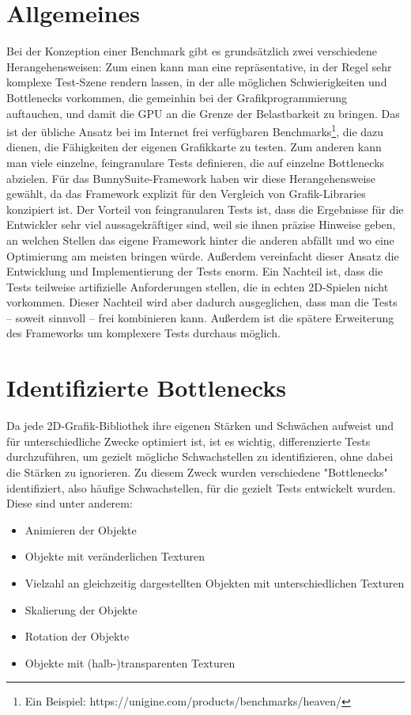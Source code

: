 \section{Allgemeines}
Bei der Konzeption einer Benchmark gibt es grundsätzlich zwei verschiedene Herangehensweisen: Zum einen kann man eine repräsentative, in der Regel sehr komplexe Test-Szene rendern lassen, in der alle möglichen Schwierigkeiten und Bottlenecks vorkommen, die gemeinhin bei der Grafikprogrammierung auftauchen, und damit die GPU an die Grenze der Belastbarkeit zu bringen. Das ist der übliche Ansatz bei im Internet frei verfügbaren Benchmarks\footnote{Ein Beispiel: https://unigine.com/products/benchmarks/heaven/}, die dazu dienen, die Fähigkeiten der eigenen Grafikkarte zu testen. Zum anderen kann man viele einzelne, feingranulare Tests definieren, die auf einzelne Bottlenecks abzielen. Für das BunnySuite-Framework haben wir diese Herangehensweise gewählt, da das Framework explizit für den Vergleich von Grafik-Libraries konzipiert ist. Der Vorteil von feingranularen Tests ist, dass die Ergebnisse für die Entwickler sehr viel aussagekräftiger sind, weil sie ihnen präzise Hinweise geben, an welchen Stellen das eigene Framework hinter die anderen abfällt und wo eine Optimierung am meisten bringen würde. Außerdem vereinfacht dieser Ansatz die Entwicklung und Implementierung der Tests enorm. Ein Nachteil ist, dass die Tests teilweise artifizielle Anforderungen stellen, die in echten 2D-Spielen nicht vorkommen. Dieser Nachteil wird aber dadurch ausgeglichen, dass man die Tests -- soweit sinnvoll -- frei kombinieren kann. Außerdem ist die spätere Erweiterung des Frameworks um komplexere Tests durchaus möglich.

\section{Identifizierte Bottlenecks}
Da jede 2D-Grafik-Bibliothek ihre eigenen Stärken und Schwächen aufweist und für unterschiedliche Zwecke optimiert ist, ist es wichtig, differenzierte Tests durchzuführen, um gezielt mögliche Schwachstellen zu identifizieren, ohne dabei die Stärken zu ignorieren. Zu diesem Zweck wurden verschiedene "Bottlenecks" identifiziert, also häufige Schwachstellen, für die gezielt Tests entwickelt wurden. Diese sind unter anderem:\\
\begin{itemize} 
\item Animieren der Objekte
\item Objekte mit veränderlichen Texturen
\item Vielzahl an gleichzeitig dargestellten Objekten mit unterschiedlichen Texturen
\item Skalierung der Objekte
\item Rotation der Objekte
\item Objekte mit (halb-)transparenten Texturen
\end{itemize}

